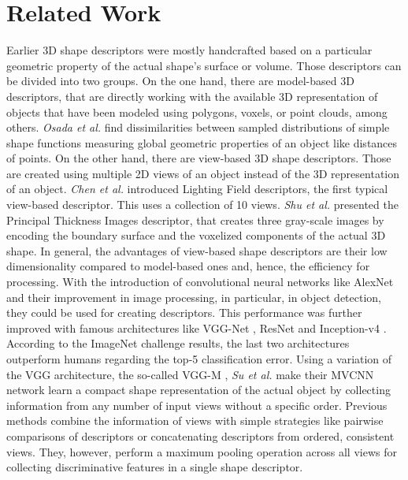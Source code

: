 \chapter{Related Work}
\label{sec:related-work}
Earlier 3D shape descriptors were mostly handcrafted based on a particular geometric property of the actual shape's surface or volume.
Those descriptors can be divided into two groups.
On the one hand, there are model-based 3D descriptors, that are directly working with the available 3D representation of objects that have been modeled using polygons, voxels, or point clouds, among others.
\textit{Osada et al.} \cite{Osada:2001:MMS:882486.884103} find dissimilarities between sampled distributions of simple shape functions measuring global geometric properties of an object like distances of points.
On the other hand, there are view-based 3D shape descriptors.
Those are created using multiple 2D views of an object instead of the 3D representation of an object.
\textit{Chen et al.} \cite{Chen2003} introduced Lighting Field descriptors, the first typical view-based descriptor.
This uses a collection of 10 views.
\textit{Shu et al.} \cite{Shu:2016:MCV:2965260.2965467} presented the Principal Thickness Images descriptor, that creates three gray-scale images by encoding the boundary surface and the voxelized components of the actual 3D shape.
In general, the advantages of view-based shape descriptors are their low dimensionality compared to model-based ones and, hence, the efficiency for processing.
With the introduction of convolutional neural networks like AlexNet \cite{Krizhevsky:2012:ICD:2999134.2999257} and their improvement in image processing, in particular, in object detection, they could be used for creating descriptors.
This performance was further improved with famous architectures like VGG-Net \cite{Simonyan15}, ResNet \cite{He2016ResNet} and Inception-v4 \cite{SzegedyInceptionv4}.
According to the ImageNet \cite{Russakovsky:2015:ILS:2846547.2846559} challenge results, the last two architectures outperform humans regarding the top-5 classification error.
Using a variation of the VGG architecture, the so-called VGG-M \cite{journals/corr/ChatfieldSVZ14}, \textit{Su et al.} \cite{Su:2015:MCN:2919332.2919750} make their MVCNN network learn a compact shape representation of the actual object by collecting information from any number of input views without a specific order.
Previous methods combine the information of views with simple strategies like pairwise comparisons of descriptors or concatenating descriptors from ordered, consistent views.
They, however, perform a maximum pooling operation across all views for collecting discriminative features in a single shape descriptor.
